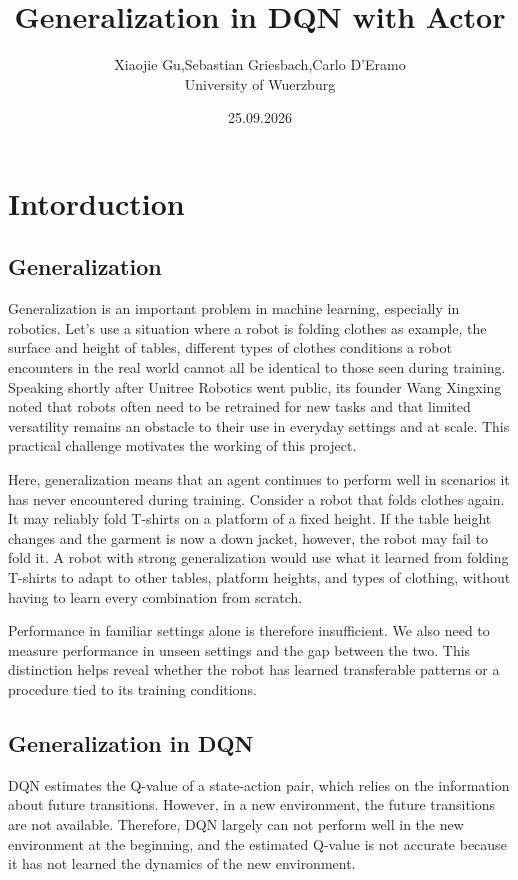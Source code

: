 \documentclass[a4paper,12pt]{article}
\title{Generalization in DQN with Actor}
\author{Xiaojie Gu,Sebastian Griesbach,Carlo D'Eramo\\University of Wuerzburg}
\date{25.09.2026}
\begin{document}
\maketitle

\section{Intorduction}

\subsection{Generalization}

Generalization is an important problem in machine learning, especially in robotics. Let's use a situation where a robot is folding clothes as example, the surface and height of tables, different types of clothes conditions a robot encounters in the real world cannot all be identical to those seen during training. Speaking shortly after Unitree Robotics went public, its founder Wang Xingxing noted that robots often need to be retrained for new tasks and that limited versatility remains an obstacle to their use in everyday settings and at scale\cite{wang2026}. This practical challenge motivates the working of this project.

Here, generalization means that an agent continues to perform well in scenarios it has never encountered during training. Consider a robot that folds clothes again. It may reliably fold T-shirts on a platform of a fixed height. If the table height changes and the garment is now a down jacket, however, the robot may fail to fold it. A robot with strong generalization would use what it learned from folding T-shirts to adapt to other tables, platform heights, and types of clothing, without having to learn every combination from scratch.

Performance in familiar settings alone is therefore insufficient. We also need to measure performance in unseen settings and the gap between the two. This distinction helps reveal whether the robot has learned transferable patterns or a procedure tied to its training conditions.

\subsection{Generalization in DQN}

DQN estimates the Q-value of a state-action pair, which relies on the information about future transitions. However, in a new environment, the future transitions are not available. Therefore, DQN largely can not perform well in the new environment at the beginning, and the estimated Q-value is not accurate because it has not learned the dynamics of the new environment.
\end{document}
